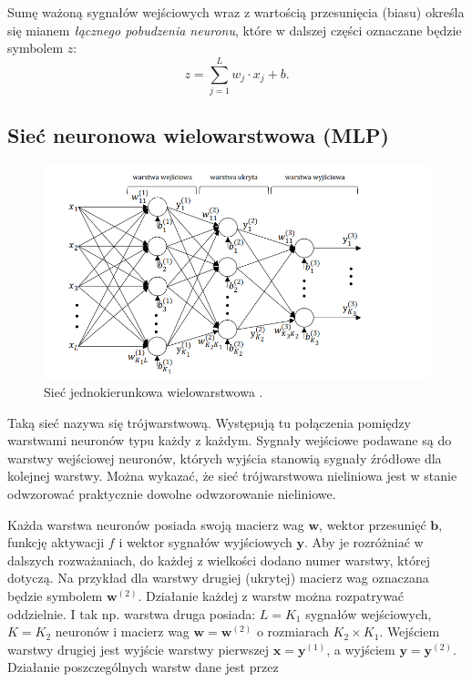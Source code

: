 \documentclass[a4paper,12pt]{article}
\begin{document}
\medskip

Sumę ważoną sygnałów wejściowych wraz z wartością przesunięcia (biasu) określa się mianem \textit{łącznego pobudzenia neuronu}, które w dalszej części oznaczane będzie symbolem \(z\):
\begin{equation}
z = \sum_{j=1}^{L} w_j \cdot x_j + b.
\end{equation}


\subsection{Sieć neuronowa wielowarstwowa (MLP)}

\begin{figure}[h!]
    \centering
    \includegraphics[width=1\linewidth]{MLP.png}
    \caption{Sieć jednokierunkowa wielowarstwowa \cite{RZajdelMLP}.}
\end{figure}

Taką sieć nazywa się trójwarstwową. Występują tu połączenia pomiędzy warstwami neuronów typu każdy z każdym.  
Sygnały wejściowe podawane są do warstwy wejściowej neuronów, których wyjścia stanowią sygnały źródłowe dla kolejnej warstwy.  
Można wykazać, że sieć trójwarstwowa nieliniowa jest w stanie odwzorować praktycznie dowolne odwzorowanie nieliniowe.

Każda warstwa neuronów posiada swoją macierz wag \(\mathbf{w}\), wektor przesunięć \(\mathbf{b}\), funkcję aktywacji \(f\) i wektor sygnałów wyjściowych \(\mathbf{y}\).  
Aby je rozróżniać w dalszych rozważaniach, do każdej z wielkości dodano numer warstwy, której dotyczą.  
Na przykład dla warstwy drugiej (ukrytej) macierz wag oznaczana będzie symbolem \(\mathbf{w}^{(2)}\).  
Działanie każdej z warstw można rozpatrywać oddzielnie.  
I tak np. warstwa druga posiada: \(L = K_1\) sygnałów wejściowych, \(K = K_2\) neuronów i macierz wag \(\mathbf{w} = \mathbf{w}^{(2)}\) o rozmiarach \(K_2 \times K_1\).  
Wejściem warstwy drugiej jest wyjście warstwy pierwszej \(\mathbf{x} = \mathbf{y}^{(1)}\), a wyjściem \(\mathbf{y} = \mathbf{y}^{(2)}\).  
Działanie poszczególnych warstw dane jest przez
\end{document}
